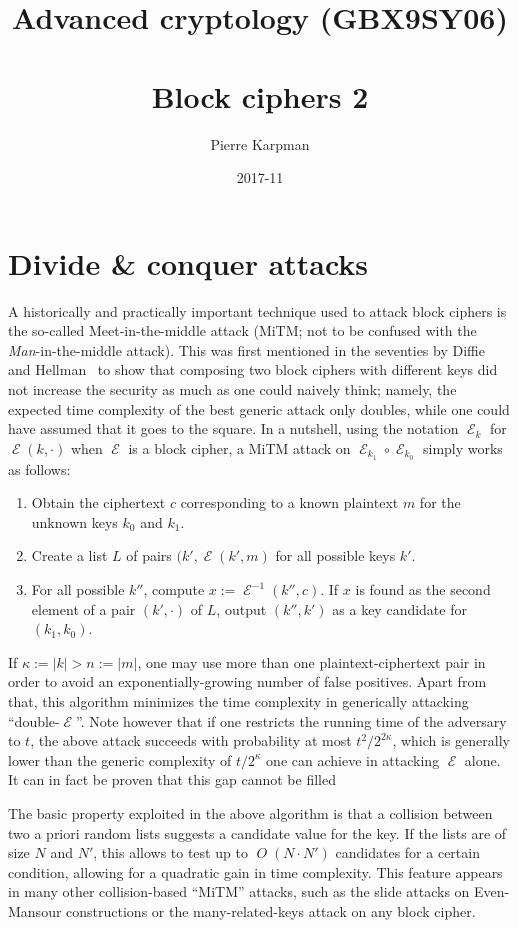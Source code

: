 \documentclass[11pt,a4paper]{article}
\title{Advanced cryptology (GBX9SY06)\\
\decosix\\
Block ciphers 2}
\date{2017-11}
\author{Pierre Karpman}
\theoremstyle{definition}
\theoremstyle{theorem}
\DeclareMathOperator\E{\mathcal{E}}
\DeclareMathOperator\bigo{\mathit{O}}
\begin{document}
\renewcommand{\algorithmautorefname}{Algorithm}

\maketitle{}

\section{Divide \& conquer attacks}

A historically and practically important technique used to attack block ciphers is the so-called Meet-in-the-middle attack (MiTM; not
to be confused with the \emph{Man}-in-the-middle attack). This was first mentioned in the seventies by Diffie and Hellman~\cite{DBLP:journals/computer/DiffieH77} to show
that composing two block ciphers with different keys did not increase the security as much as one could naively think; namely, the
expected time complexity of the best generic attack only doubles, while one could have assumed that it goes to the square. In a nutshell,
using the notation $\E_k$ for $\E(k,\cdot)$ when $\E$ is a block cipher, a MiTM attack on $\E_{k_1} \circ \E_{k_0}$ simply works as follows:
\begin{enumerate}
\item Obtain the ciphertext $c$ corresponding to a known plaintext $m$ for the unknown keys $k_0$ and $k_1$.
\item Create a list $L$ of pairs $(k', \E(k',m)$ for all possible keys $k'$.
\item For all possible $k''$, compute $x := \E^{-1}(k'',c)$. If $x$ is found as the second element of a pair $(k',\cdot)$ of $L$,
output $(k'',k')$ as a key candidate for $(k_1,k_0)$.
\end{enumerate}
If $\kappa:=|k| > n:=|m|$, one may use more than one plaintext-ciphertext pair in order to avoid an exponentially-growing number of false
positives. Apart from that, this algorithm minimizes the time complexity in generically attacking ``double-$\E$''. Note however that
if one restricts the running time of the adversary to $t$, the above attack succeeds with probability at most $t^2/2^{2\kappa}$, which
is generally lower than the generic complexity of $t/2^\kappa$ one can achieve in attacking $\E$ alone. It can in fact be proven
that this gap cannot be filled~\cite{DBLP:conf/crypto/AielloBCV98}

The basic property exploited in the above algorithm is that a collision between two a priori random lists suggests a candidate
value for the key. If the lists are of size $N$ and $N'$, this allows to test up to $\bigo(N\cdot N')$ candidates for a certain
condition, allowing for a quadratic gain in time complexity. This feature appears in many other collision-based ``MiTM'' attacks,
such as the slide attacks on Even-Mansour constructions or the many-related-keys attack on any block cipher.
\end{document}
